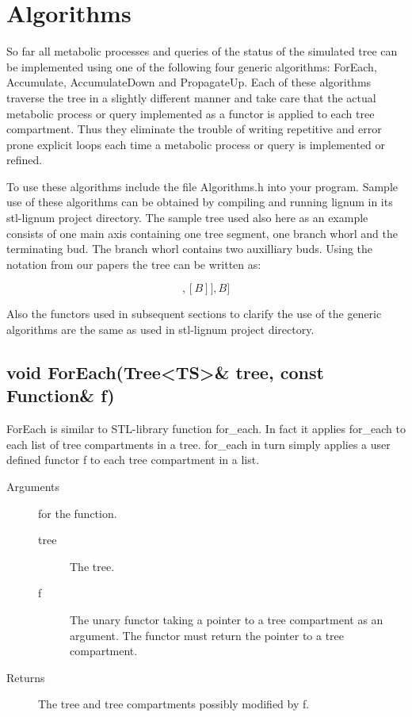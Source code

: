 \section{Algorithms}

So  far all  metabolic  processes and  queries  of the  status of  the
simulated  tree can  be implemented  using one  of the  following four
generic   algorithms:    ForEach,   Accumulate,   AccumulateDown   and
PropagateUp.  Each of these algorithms traverse the tree in a slightly
different manner  and take care  that the actual metabolic  process or
query implemented  as a functor  is applied to each  tree compartment.
Thus they eliminate the trouble  of writing repetitive and error prone
explicit loops each  time a metabolic process or  query is implemented
or refined.

To  use  these algorithms  include  the  file  Algorithms.h into  your
program. Sample use  of these algorithms can be  obtained by compiling
and  running lignum in  its stl-lignum  project directory.  The sample
tree used also here as an example consists of one main axis containing
one tree segment, one branch whorl and the terminating bud. The branch
whorl contains two auxilliary buds. Using the notation from our papers
the tree can be written as:

\begin{displaymath}
[TS,[[B],[B]],B]
\end{displaymath}

Also the  functors used in subsequent  sections to clarify  the use of
the  generic algorithms  are the  same as  used in  stl-lignum project
directory.
 
\subsection{void ForEach(Tree<TS>\& tree, const Function\& f)}

ForEach is similar to  STL-library  function  for\_each.  In fact   it
applies  for\_each to  each  list  of  tree  compartments  in a  tree.
for\_each in turn simply applies a user defined functor f to each tree
compartment in a list.

\begin{description}
    \item [Arguments] for the function.
      \begin{description}
        \item [tree] The tree.
        \item [f]  The unary   functor  taking a   pointer to a   tree
      compartment as an argument. The functor  must return the pointer
      to a tree compartment.
     \end{description} 
   \item[Returns] The tree and tree compartments possibly modified by f.
\end{description} 

